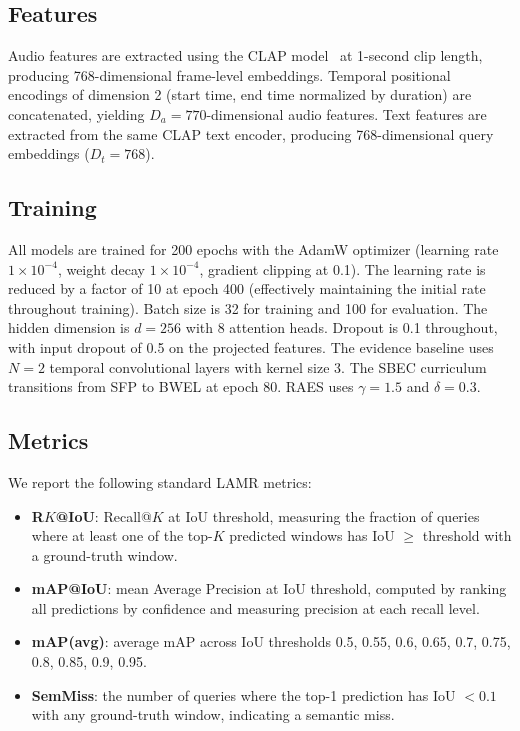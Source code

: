 \documentclass[conference]{IEEEtran}
\begin{document}
\subsection{Features}
Audio features are extracted using the CLAP model~\cite{clap} at 1-second clip
length, producing 768-dimensional frame-level embeddings.  Temporal positional
encodings of dimension 2 (start time, end time normalized by duration) are
concatenated, yielding \(D_a = 770\)-dimensional audio features.  Text features
are extracted from the same CLAP text encoder, producing 768-dimensional query
embeddings (\(D_t = 768\)).

\subsection{Training}
All models are trained for 200 epochs with the AdamW optimizer (learning rate
\(1 \times 10^{-4}\), weight decay \(1 \times 10^{-4}\), gradient clipping at 0.1).
The learning rate is reduced by a factor of 10 at epoch 400 (effectively
maintaining the initial rate throughout training).  Batch size is 32 for
training and 100 for evaluation.  The hidden dimension is \(d = 256\) with 8
attention heads.  Dropout is 0.1 throughout, with input dropout of 0.5 on
the projected features.  The evidence baseline uses \(N = 2\) temporal
convolutional layers with kernel size 3.  The SBEC curriculum transitions from
SFP to BWEL at epoch 80.  RAES uses \(\gamma = 1.5\) and \(\delta = 0.3\).

\subsection{Metrics}
We report the following standard LAMR metrics:
\begin{itemize}
  \item \textbf{R\(K\)@IoU}: Recall@\(K\) at IoU threshold, measuring the fraction
        of queries where at least one of the top-\(K\) predicted windows has IoU
        \(\geq\) threshold with a ground-truth window.
  \item \textbf{mAP@IoU}: mean Average Precision at IoU threshold, computed by
        ranking all predictions by confidence and measuring precision at each
        recall level.
  \item \textbf{mAP(avg)}: average mAP across IoU thresholds 0.5, 0.55, 0.6,
        0.65, 0.7, 0.75, 0.8, 0.85, 0.9, 0.95.
  \item \textbf{SemMiss}: the number of queries where the top-1 prediction has
        IoU \(< 0.1\) with any ground-truth window, indicating a semantic miss.
\end{itemize}
\end{document}
